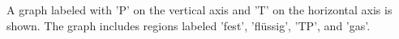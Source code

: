 A graph labeled with 'P' on the vertical axis and 'T' on the horizontal axis is shown. The graph includes regions labeled 'fest', 'flüssig', 'TP', and 'gas'.